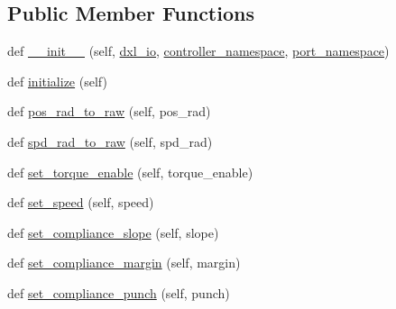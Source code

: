 \subsection*{Public Member Functions}
\begin{DoxyCompactItemize}
\item 
def \hyperlink{classdynamixel__controllers_1_1joint__position__controller_1_1_joint_position_controller_aec8b05836c1f340f02ede6ce37030f0a}{\+\_\+\+\_\+init\+\_\+\+\_\+} (self, \hyperlink{classdynamixel__controllers_1_1joint__controller_1_1_joint_controller_a8be2fb1ed88aee6590c938122361c780}{dxl\+\_\+io}, \hyperlink{classdynamixel__controllers_1_1joint__controller_1_1_joint_controller_a8b34f86e463a0ce3fcf52a09b6ea7dc2}{controller\+\_\+namespace}, \hyperlink{classdynamixel__controllers_1_1joint__controller_1_1_joint_controller_ac89de71afa48761fb662ac2917a5b9d3}{port\+\_\+namespace})
\item 
def \hyperlink{classdynamixel__controllers_1_1joint__position__controller_1_1_joint_position_controller_af5eef7a725f62cec172e820e4351ef5b}{initialize} (self)
\item 
def \hyperlink{classdynamixel__controllers_1_1joint__position__controller_1_1_joint_position_controller_ac67e65576e301dab233d3c70444e48f3}{pos\+\_\+rad\+\_\+to\+\_\+raw} (self, pos\+\_\+rad)
\item 
def \hyperlink{classdynamixel__controllers_1_1joint__position__controller_1_1_joint_position_controller_ac82aa3145e2ba55f75b43563827828d5}{spd\+\_\+rad\+\_\+to\+\_\+raw} (self, spd\+\_\+rad)
\item 
def \hyperlink{classdynamixel__controllers_1_1joint__position__controller_1_1_joint_position_controller_a80d5042e40ee74689971f11c75c738ab}{set\+\_\+torque\+\_\+enable} (self, torque\+\_\+enable)
\item 
def \hyperlink{classdynamixel__controllers_1_1joint__position__controller_1_1_joint_position_controller_ad5d41a8353d4ddf33d8aa25dc3000efc}{set\+\_\+speed} (self, speed)
\item 
def \hyperlink{classdynamixel__controllers_1_1joint__position__controller_1_1_joint_position_controller_aa802e87f5c3cd1b219f8342dc3f9e118}{set\+\_\+compliance\+\_\+slope} (self, slope)
\item 
def \hyperlink{classdynamixel__controllers_1_1joint__position__controller_1_1_joint_position_controller_a5298e5e5fae5a02f0c3938d308c96544}{set\+\_\+compliance\+\_\+margin} (self, margin)
\item 
def \hyperlink{classdynamixel__controllers_1_1joint__position__controller_1_1_joint_position_controller_ab4a3ec4871c686e83a0bbd4d0cb0cd14}{set\+\_\+compliance\+\_\+punch} (self, punch)

\end{DoxyCompactItemize}
